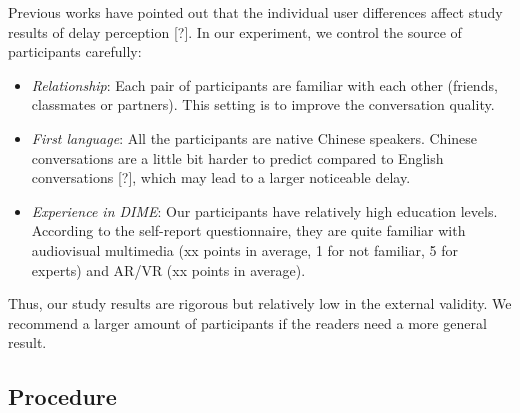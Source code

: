 Previous works have pointed out that the individual user differences affect study results of delay perception [?]. In our experiment, we control the source of participants carefully:

\begin{itemize}
    \item \emph{Relationship}: Each pair of participants are familiar with each other (friends, classmates or partners). This setting is to improve the conversation quality.
    
    \item \emph{First language}: All the participants are native Chinese speakers. Chinese conversations are a little bit harder to predict compared to English conversations [?], which may lead to a larger noticeable delay.
    
    \item \emph{Experience in DIME}: Our participants have relatively high education levels. According to the self-report questionnaire, they are quite familiar with audiovisual multimedia (xx points in average, 1 for not familiar, 5 for experts) and AR/VR (xx points in average).
\end{itemize}

Thus, our study results are rigorous but relatively low in the external validity. We recommend a larger amount of participants if the readers need a more general result.

\subsection{Procedure}



